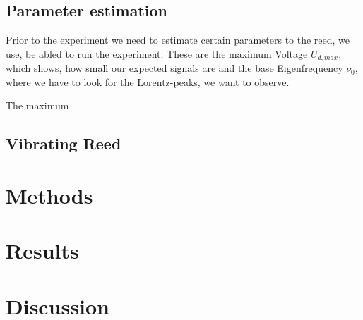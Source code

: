 \documentclass[twoside, a4paper, DIV=11,twocolumn, 12pt]{book}
\begin{document}
\section{Parameter estimation}

Prior to the experiment we need to estimate certain parameters to the reed, we use, be abled to run the experiment. These are the maximum Voltage $U_{d,max}$, which shows, 
how small our expected signals are and the base Eigenfrequency $\nu_0$, where we have to look for the Lorentz-peaks, we want to observe.


The maximum


\section{Vibrating Reed}
\label{sec:reed}

\chapter{Methods}
\label{sec:meth}


\chapter{Results}
\label{sec:res}

\chapter{Discussion}
\label{sec:disk}

\end{document}
